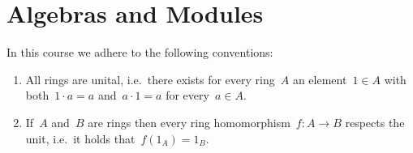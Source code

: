 \chapter{Algebras and Modules}


\begin{conventions}
  In this course we adhere to the following conventions:
  \begin{enumerate}
    \item
      All rings are unital, i.e.\ there exists for every ring~$A$ an element~$1 \in A$ with both~$1 \cdot a = a$ and~$a \cdot 1 = a$ for every~$a \in A$.
    \item
      If~$A$ and~$B$ are rings then every ring homomorphism~$f \colon A \to B$ respects the unit, i.e.\ it holds that~$f(1_A) = 1_B$.
  \end{enumerate}
\end{conventions}













